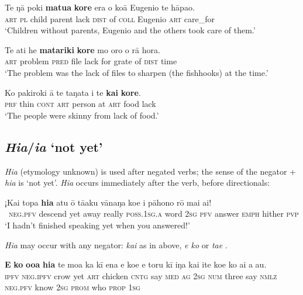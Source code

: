 \ea\label{ex:10.164}
\gll Te ŋā poki \textbf{matu{\ꞌ}a} \textbf{kore} era o koā Eugenio te hāpa{\ꞌ}o.\\
\textsc{art} \textsc{pl} child parent lack \textsc{dist} of \textsc{coll} Eugenio \textsc{art} care\_for\\

\glt 
‘Children without parents, Eugenio and the others took care of them.’ \textstyleExampleref{[R231.308]} 
\z

\ea\label{ex:10.165}
\gll Te {\ꞌ}ati he \textbf{matariki} \textbf{kore} mo oro o rā hora. \\
\textsc{art} problem \textsc{pred} file lack for grate of \textsc{dist} time \\

\glt 
‘The problem was the lack of files to sharpen (the fishhooks) at the time.’ \textstyleExampleref{[R539-1.335]}
\z

\ea\label{ex:10.166}
\gll Ko pakiroki {\ꞌ}ā te taŋata {\ꞌ}i te \textbf{kai} \textbf{kore}.\\
\textsc{prf} thin \textsc{cont} \textsc{art} person at \textsc{art} food lack\\

\glt 
‘The people were skinny from lack of food.’ \textstyleExampleref{[R372.025]} 
\z
{}

\subsection{\textit{Hia}/\textit{ia} ‘not yet’}\label{sec:10.5.8}
\textit{Hia} (etymology unknown) is used after negated verbs; the sense of the negator + \textit{hia} is ‘not yet’. \textit{Hia} occurs immediately after the verb, before directionals:

\ea\label{ex:10.167}
\gll ¡Kai topa \textbf{hia} atu {\ꞌ}ō tā{\ꞌ}aku vānaŋa koe i pāhono rō mai ai! \\
~\textsc{neg.pfv} descend yet away really \textsc{poss.1sg.a} word \textsc{2sg} \textsc{pfv} answer \textsc{emph} hither \textsc{pvp} \\

\glt
‘I hadn’t finished speaking yet when you answered!’ \textstyleExampleref{[R314.139]} 
\z

\textit{Hia} may occur with any negator: \textit{kai} as in  above, \textit{e ko}  or \textit{ta{\ꞌ}e} .

\ea\label{ex:10.168}
\gll \textbf{E} \textbf{ko} \textbf{{\ꞌ}o{\ꞌ}oa} \textbf{hia} te moa ka kī ena e koe e toru kī iŋa  kai {\ꞌ}ite koe ko ai a au.\\
\textsc{ipfv} \textsc{neg.ipfv} crow yet \textsc{art} chicken \textsc{cntg} say \textsc{med} \textsc{ag} \textsc{2sg} \textsc{num} three say \textsc{nmlz}  \textsc{neg.pfv} know \textsc{2sg} \textsc{prom} who \textsc{prop} \textsc{1sg}\\

